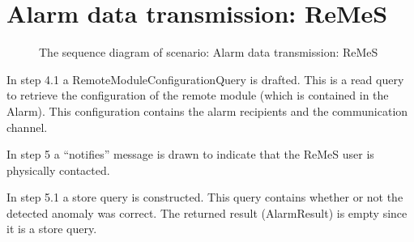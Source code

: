 \section{Alarm data transmission: ReMeS}

\begin{figure}
	\begin{centering}
		\caption{The sequence diagram of scenario: Alarm data transmission: ReMeS}
		\label{fig:scenario-5-10}
	\end{centering}
\end{figure}

\npar In step 4.1 a RemoteModuleConfigurationQuery is drafted. This is a read
query to retrieve the configuration of the remote module (which is contained in
the Alarm). This configuration contains the alarm recipients and the
communication channel.

\npar In step 5 a ``notifies'' message is drawn to indicate that the ReMeS user
is physically contacted.

\npar In step 5.1 a store query is constructed. This query contains whether or
not the detected anomaly was correct. The returned result (AlarmResult) is empty
since it is a store query.

